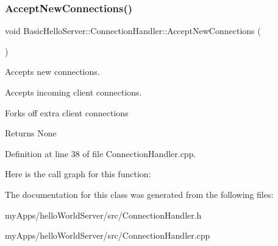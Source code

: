 \subsubsection{\texorpdfstring{AcceptNewConnections()}{AcceptNewConnections()}}
{\footnotesize\ttfamily void Basic\+Hello\+Server\+::\+Connection\+Handler\+::\+Accept\+New\+Connections (\begin{DoxyParamCaption}{ }\end{DoxyParamCaption})}



Accepts new connections. 

Accepts incoming client connections.

Forks off extra client connections

\begin{DoxyReturn}{Returns}
None 
\end{DoxyReturn}


Definition at line 38 of file Connection\+Handler.\+cpp.

Here is the call graph for this function\+:


The documentation for this class was generated from the following files\+:\begin{DoxyCompactItemize}
\item 
my\+Apps/hello\+World\+Server/src/Connection\+Handler.\+h\item 
my\+Apps/hello\+World\+Server/src/Connection\+Handler.\+cpp\end{DoxyCompactItemize}
